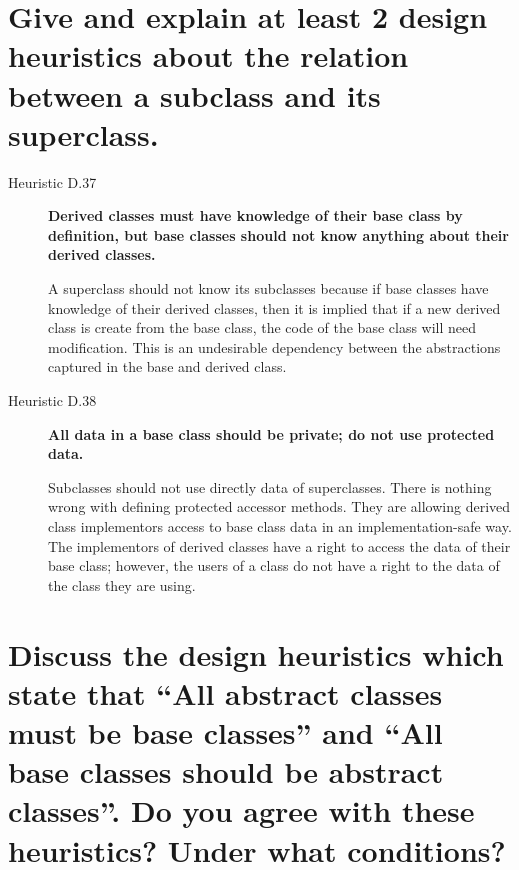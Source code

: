 \section{Give and explain at least 2 design heuristics about the relation between a subclass and its
superclass.}

\begin{description}
\item[Heuristic D.37] \textbf{Derived classes must have knowledge of their base class by  definition, but base classes should not know anything about their derived classes.}

A superclass should not know its subclasses because if base classes have knowledge of their derived classes, then it is implied that if a new derived class is create from the base class, the code of the base class will need modification. This is an undesirable dependency between the abstractions captured in the base and derived class.

\item[Heuristic D.38] \textbf{All data in a base class should be private; do not use protected data.}


Subclasses should not use directly data of superclasses.
There is nothing wrong with defining protected accessor methods. They are allowing derived class implementors access to base class data in an implementation-safe way. The implementors of derived classes have a right to access the data of their base class; however, the users of a class do not have a right to the data of the class they are using.


\end{description}


\section{Discuss the design heuristics which state that “All abstract classes must be base classes”
and “All base classes should be abstract classes”. Do you agree with these heuristics? Under what conditions?}


